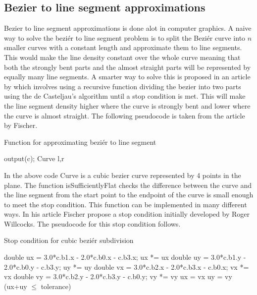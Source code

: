 \subsection{Bezier to line segment approximations}
Bezier to line segment approximations is done alot in computer graphics. A naive way to solve the beziér to line segment problem is to split the Beziér curve into $n$ smaller curves with a constant length and approximate them to line segments. This would make the line density constant over the whole curve meaning that both the strongly bent parts and the almost straight parts will be represented by equally many line segments. A smarter way to solve this is proposed in an article by \citet{fischer2000} which involves using a recursive function dividing the bezier into two parts using the de Casteljau's algorithm until a stop condition is met. This will make the line segment density higher where the curve is strongly bent and lower where the curve is almost straight. The following pseudocode is taken from the article by Fischer.
\begin{algorithm}[H]
\caption{Function for approximating beziér to line segment}
\begin{algorithmic}
  \State output(c);
\Else
	\State Curve l,r\;
	\State{}\;
	\State{}\;
	\State{}\;
\EndIf
\EndProcedure
\end{algorithmic}
\end{algorithm}
In the above code Curve is a cubic bezier curve represented by 4 points in the plane. The function isSufficientlyFlat checks the difference between the curve and the line segment from the start point to the endpoint of the curve is small enough to meet the stop condition. This function can be implemented in many different ways. In his article Fischer propose a stop condition initially developed by Roger Willcocks. The pseudocode for this stop condition follows.

\begin{algorithm}[H]
\caption{Stop condition for cubic beziér subdivision}
\begin{algorithmic}
	\State double ux = 3.0*c.b1.x - 2.0*c.b0.x - c.b3.x; ux *= ux\;
	\State double uy = 3.0*c.b1.y - 2.0*c.b0.y - c.b3.y; uy *= uy\;
	\State double vx = 3.0*c.b2.x - 2.0*c.b3.x - c.b0.x; vx *= vx\;
	\State double vy = 3.0*c.b2.y - 2.0*c.b3.y - c.b0.y; vy *= vy\;
	\State ux = vx\; 	
	\EndIf
		\State uy = vy\; 
	\EndIf
	\State\Return (ux+uy $\leq$ tolerance)\;
\EndFunction
\end{algorithmic}
\end{algorithm}

